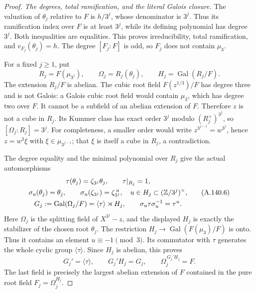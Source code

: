 \begin{proof}
\emph{The degrees, total ramification, and the literal Galois closure.}
The valuation of \(\theta_j\) relative to \(F\)
is \(h/3^j\), whose denominator is \(3^j\).
Thus its ramification index over \(F\) is at
least \(3^j\), while its defining polynomial
has degree \(3^j\).
Both inequalities are equalities.
This proves irreducibility, total ramification,
and \(v_{F_j}(\theta_j)=h\).
The degree \([F_j:F]\) is odd, so \(F_j\)
does not contain \(\mu_3\).

For a fixed \(j\ge1\), put
\[
 R_j=F(\mu_{3^j}),\qquad
 \Omega_j=R_j(\theta_j),\qquad
 H_j=\operatorname{Gal}(R_j/F).
\tag{A.140.5}
\]
The extension \(R_j/F\) is abelian.
The cubic root field \(F(z^{1/3})/F\) has
degree three and is not Galois: a Galois
cubic root field would contain \(\mu_3\),
which has degree two over \(F\).
It cannot be a subfield of an abelian
extension of \(F\).
Therefore \(z\) is not a cube in \(R_j\).
Its Kummer class has exact order \(3^j\)
modulo \((R_j^\times)^{3^j}\), so
\([\Omega_j:R_j]=3^j\).
For completeness, a smaller order would
write \(z^{3^{j-1}}=w^{3^j}\), hence
\(z=w^3\xi\) with
\(\xi\in\mu_{3^{j-1}}\); that \(\xi\)
is itself a cube in \(R_j\), a contradiction.

The degree equality and the minimal polynomial
over \(R_j\) give the actual automorphisms
\[
 \begin{gathered}
 \tau(\theta_j)=\zeta_{3^j}\theta_j,\qquad
 \tau|_{R_j}=1,\\
 \sigma_u(\theta_j)=\theta_j,\qquad
 \sigma_u(\zeta_{3^j})=\zeta_{3^j}^{\,u},
                  \quad u\in H_j\subset(\mathbb Z/3^j)^\times,\\
 G_j:=\operatorname{Gal}(\Omega_j/F)
       =\langle\tau\rangle\rtimes H_j,\qquad
             \sigma_u\tau\sigma_u^{-1}=\tau^u .
 \end{gathered}
\tag{A.140.6}
\]
Here \(\Omega_j\) is the splitting field of
\(X^{3^j}-z\), and the displayed \(H_j\)
is exactly the stabilizer of the chosen
root \(\theta_j\).
The restriction \(H_j\to\operatorname{Gal}
(F(\mu_3)/F)\) is onto.
Thus it contains an element \(u\equiv-1\pmod3\).
Its commutator with \(\tau\) generates the
whole cyclic group \(\langle\tau\rangle\).
Since \(H_j\) is abelian, this proves
\[
 G_j'=\langle\tau\rangle,\qquad
 G_j'H_j=G_j,\qquad
                  \Omega_j^{\,G_j'H_j}=F .
\tag{A.140.7}
\]
The last field is precisely the largest
abelian extension of \(F\) contained in
the pure root field \(F_j=\Omega_j^{H_j}\).


\end{proof}
